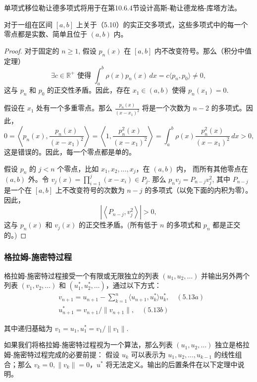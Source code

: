 \documentclass[a4paper]{ctexart}
\newcommand{\hl}[1]
{\noindent {\bf {#1}}}
\begin{document}
{\hl{备注 5.7} 单项式移位勒让德多项式将用于在第10.6.4节设计高斯-勒让德龙格-库塔方法。

\hl{定理 5.18} 对于一组在区间 \([a, b]\) 上关于（5.10）的实正交多项式，这些多项式中的每一个零点都是实数、简单且位于 \((a, b)\) 内。

\begin{proof}
对于固定的 \( n \geq 1 \), 假设 \( p_n(x) \) 在 \([a, b]\) 内不改变符号。那么（积分中值定理）
\[
  \exists c \in \mathbb{R}^{+} \text{ 使得 } \int_{a}^{b} \rho(x) p_{n}(x) \, dx = c \langle p_{n}, p_{0} \rangle \neq 0,
\]
这与 \( p_n \) 和 \( p_0 \) 的正交性矛盾。因此，存在 \( x_1 \in (a, b) \) 使得 \( p_n(x_1) = 0 \).
  
假设在 \( x_1 \) 处有一个多重零点。那么 \( \frac{p_n(x)}{(x - x_1)^2} \) 将是一个次数为 \( n - 2 \) 的多项式。因此，
\[
  0 = \left\langle p_n(x), \frac{p_n(x)}{(x-x_1)^2} \right\rangle = \left\langle 1, \frac{p_n^2(x)}{(x-x_1)^2} \right\rangle 
  = \int_{a}^{b} \rho(x) \frac{p_n^2(x)}{(x-x_1)^2} \, dx > 0,
\]
这是错误的。因此，每一个零点都是单的。
  
假设 \( p_n \) 的 \( j < n \) 个零点，比如 \( x_1, x_2, \ldots, x_j \)，在 \((a, b)\) 内，
而所有其他零点在 \((a, b)\) 外。令 \( v_j(x) = \prod_{i=1}^{j} (x - x_i) \in P_j \). 
那么 \( p_n v_j = P_{n-j} v_j^2 \), 其中 \( P_{n-j} \) 是一个在 \([a, b]\) 上不改变符号的次数为 \( n-j \) 的多项式（以免下面的内积为零）。因此，
\[
  \left| \left\langle P_{n-j}, v_j^2 \right\rangle \right| > 0,
\]
这与 \( p_n(x) \) 和 \( v_j(x) \) 的正交性矛盾。(所有低于 $n$ 的多项式和 $p_n$ 都是正交的。)
\end{proof}

\subsubsection{格拉姆-施密特过程}


\hl{定义 5.19} 格拉姆-施密特过程接受一个有限或无限独立的列表 \((u_1, u_2, \ldots)\) 并输出另外两个列表 \((v_1, v_2, \ldots)\) 和 
\((u_1^*, u_2^*, \ldots)\)，通过以下方式：
\begin{align*}
& v_{n+1} = u_{n+1} - \sum_{k=1}^n \langle u_{n+1}, u_k^* \rangle u_k^*, \quad (5.13a) \\
& u_{n+1}^* = v_{n+1} / \|v_{n+1}\|, \quad (5.13b)
\end{align*}

其中递归基础为 \(v_1 = u_1, u_1^* = v_1 / \|v_1\|\).

\hl{备注 5.8} 如果我们将格拉姆-施密特过程视为一个算法，那么列表 \((u_1, u_2, \ldots)\) 独立是格拉姆-施密特过程完成的必要前提：
假设 \(u_k\) 可以表示为 \(u_1, u_2, \ldots, u_{k-1}\) 的线性组合；那么 \(v_k = 0, \|v_k\| = 0\)，\(u^*\) 将无法定义。输出的后置条件在以下定理中说明。

}
\end{document}
